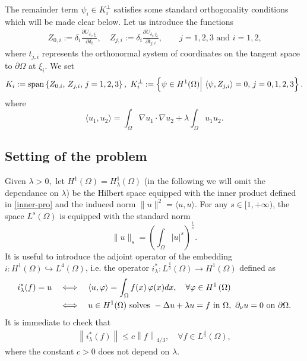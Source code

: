 \documentclass[a4paper,reqno,11pt,oneside]{amsart}
\numberwithin{equation}{section}
\begin{document}
The remainder term $\psi_i\in K_i^\perp$ satisfies some standard orthogonality conditions which will be made clear below.
Let us introduce the functions
    \begin{align}
        \label{ker-element}
        Z_{0,i}:=\delta_i\frac{\partial U_{\delta_i,\xi_i}}{\partial \delta_i},\quad Z_{j,i}:=\delta_i\frac{\partial U_{\delta_i,\xi_i}}{\partial t_{j,i}},\qquad  \text{$j=1,2,3$ and $i=1,2$,}
    \end{align}
where $t_{j,i}$ represents the orthonormal system of coordinates on the tangent space to $\partial\Omega$ at $\xi_i$. We set
$$
    K_i:={\rm span}\left\{Z_{0,i},\, Z_{j,i},\, j=1,2,3\right\},\  K_i^{{\perp}}:=\left\{\psi\in H^1(\Omega)\Big|\,\left\langle \psi, Z_{j,i}\right\rangle  =0,\, j=0,1,2,3\right\}.
$$
where 
\begin{equation}
    \label{inner-pro}\langle u_1, u_2\rangle  =\displaystyle\int_{ \Omega} \nabla u_1 \cdot \nabla u_2+\lambda\displaystyle\int_{ \Omega}u_1u_2.
\end{equation}
 
 
  
  
\subsection{Setting of the problem}
Given $\lambda>0,$ let $H^1 (\Omega)=H^1_\lambda (\Omega)$ (in the following we will omit the dependance on $\lambda$) be the Hilbert space  equipped with  the inner product defined in \eqref{inner-pro} and the induced  norm $\|u\|^2=\langle u, u\rangle  .$
For any $s \in[1,+\infty)$, the space $L^s(\Omega)$ is equipped with the standard norm
$$
\|u\|_{s}=\left(\displaystyle\int_{\Omega}|u|^s\right)^{\frac{1}{s}}.
$$
It is useful to introduce the adjoint operator of the embedding $
i: H^1( \Omega)\hookrightarrow L^4(\Omega)$, i.e.  the operator
$i_\lambda^{*}:L^{\frac{4}{3}}(\Omega)\to H^{1}(\Omega)$ defined as
    $$\begin{aligned}
i_\lambda^*(f)=u &\quad \Longleftrightarrow \quad {\left\langle u, \varphi\right\rangle}=\displaystyle\int_{\Omega} f(x)\, \varphi(x) d x, \quad \forall \varphi \in {H}^1\left(\Omega\right)\\ &\quad \Longleftrightarrow \quad
u\in H^{1}(\Omega)\ \hbox{solves}\ 
-\Delta u+\lambda u= f\ \hbox{in}\ \Omega,\ 
\partial_{\nu}u=0\ \hbox{on}\ \partial\Omega.\end{aligned}
$$
 It is immediate to check that
 \begin{align*}
    { \left\|i_\lambda^{*}(f)\right\|\leq c \left\|f\right\|_{{{4}/{3}}},\quad \forall f\in L^{\frac{4}{3}}(\Omega),}
\end{align*}
where the constant $c>0$ does not depend on $\lambda$.
 \\
 
\end{document}
